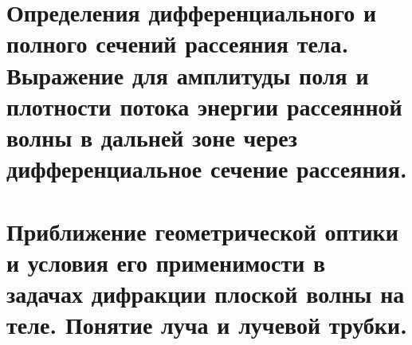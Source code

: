 \begin{multicols*}{2}
		\section{Определения дифференциального и полного сечений рассеяния тела. Выражение для амплитуды поля и плотности потока энергии рассеянной волны в дальней зоне через дифференциальное сечение рассеяния. }
		
		\section{Приближение геометрической оптики и условия его применимости в задачах дифракции плоской волны на теле. Понятие луча и лучевой трубки. }
		
	\end{multicols*}
